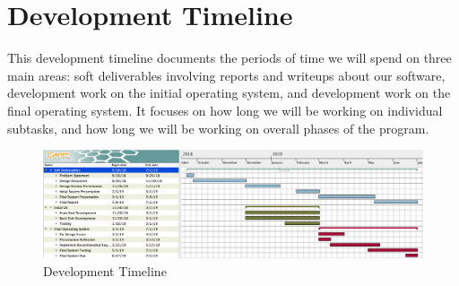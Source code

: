 \chapter{Development Timeline}

This development timeline documents the periods of time we will spend on three main areas: soft deliverables involving reports and writeups about our software, development work on the initial operating system, and development work on the final operating system. It focuses on how long we will be working on individual subtasks, and how long we will be working on overall phases of the program.


\begin{figure}[ht]
    \centering
    \includegraphics[scale=0.35]{devtimeline.png}
    \caption{Development Timeline}
\end{figure}